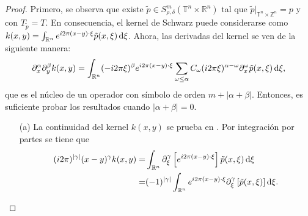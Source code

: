 \begin{proof}
	Primero, se observa que existe $\tilde{p} \in S^m_{\rho, \delta}(\mathbb{T}^n \times \mathbb{R}^n)$ tal que $\tilde{p}|_{\mathbb{T}^n \times \mathbb{Z}^n} = p$ y con $T_{\tilde{p}} = T$. En consecuencia, el kernel de Schwarz puede considerarse como $k(x, y) = \int_{\mathbb{R}^n} e^{i2\pi(x-y)\cdot \xi} \tilde{p}(x, \xi)\mathop{}\!\mathrm{d}\xi $. Ahora, las derivadas del kernel se ven de la siguiente manera:
	\begin{equation}
		\partial^\alpha_x \partial^\beta_y k(x, y) = \int_{\mathbb{R}^n} (-i2\pi\xi)^\beta e^{i2\pi(x-y)\cdot \xi} \sum_{\omega \leq \alpha} C_\omega (i2\pi\xi)^{\alpha - \omega} \partial^\omega_x \tilde{p}(x, \xi) \mathop{}\!\mathrm{d}\xi,
		\label{eq:derivada-nucleo}
	\end{equation}
	que es el núcleo de un operador con símbolo de orden $m + |\alpha + \beta|$. Entonces, es suficiente probar los resultados cuando $|\alpha + \beta| = 0$.
	\begin{itemize}
		\item[(a)] La continuidad del kernel $k(x, y)$ se prueba en \cite[Teorema~4.3.6]{ruzhansky-turunen}. Por integración por partes se tiene que
		\begin{align*}
			(i2\pi)^{|\gamma|}(x - y)^\gamma k(x, y) =& \int_{\mathbb{R}^n} \partial^\gamma_\xi \left[e^{i2\pi(x-y)\cdot \xi} \right]  \tilde{p}(x, \xi) \mathop{}\!\mathrm{d}\xi \\
			= & (-1)^{|\gamma|} \int_{\mathbb{R}^n} e^{i2\pi(x-y)\cdot \xi} \partial^\gamma_\xi \left[\tilde{p}(x, \xi) \right] \mathop{}\!\mathrm{d}\xi .
		\end{align*}
		

\end{itemize}
\end{proof}
